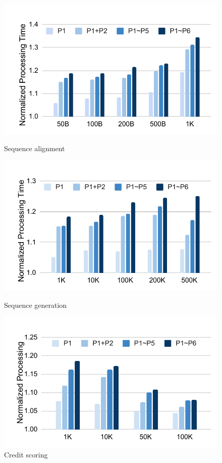\begin{figure}[htbp]
\begin{center}
\begin{minipage}[t]{0.33\linewidth}
    \centering
    \includegraphics[scale=0.46]{figures/fg-nw-perf.pdf}
    \caption{Sequence alignment}\label{fg-nw-perf}
\end{minipage}
\begin{minipage}[t]{0.33\linewidth}
    \centering
    \includegraphics[scale=0.46]{figures/fg-fasta-perf.pdf}
    \caption{Sequence generation}\label{fg-fasta-perf}
\end{minipage}
\begin{minipage}[t]{0.32\linewidth}
    \centering
    \includegraphics[scale=0.46]{figures/fg-credit-score.pdf}
    \caption{Credit scoring}\label{fg-credit-score}
\end{minipage}
\end{center}
\vspace{-12pt}
\end{figure}